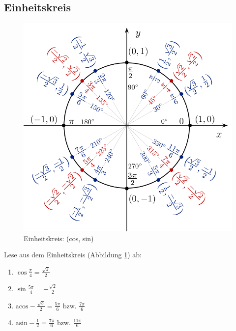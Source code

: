 \documentclass[11pt, a4paper]{article}
\newcommand{\acos}{\mathrm{acos}}
\newcommand{\asin}{\mathrm{asin}}
\begin{document}
\subsection{Einheitskreis}
\begin{figure}[h!]
	\centering
	\includegraphics[height=\textwidth]{Einheitskreis.png}
	\caption{Einheitskreis: (cos, sin)}
	\label{einheitskreis}
\end{figure}
Lese aus dem Einheitskreis (Abbildung \ref{einheitskreis}) ab:
\begin{enumerate}
	\item $\cos \frac{\pi}{4} = \frac{\sqrt{2}}{2}$
	\item $\sin \frac{5\pi}{4} = -\frac{\sqrt{2}}{2}$
	\item $\acos -\frac{\sqrt{3}}{2} = \frac{5\pi}{6} \text{ bzw. } \frac{7\pi}{6}$
	\item $\asin -\frac{1}{2} = \frac{7\pi}{6} \text{ bzw. } \frac{11\pi}{6}$
\end{enumerate}
\end{document}

